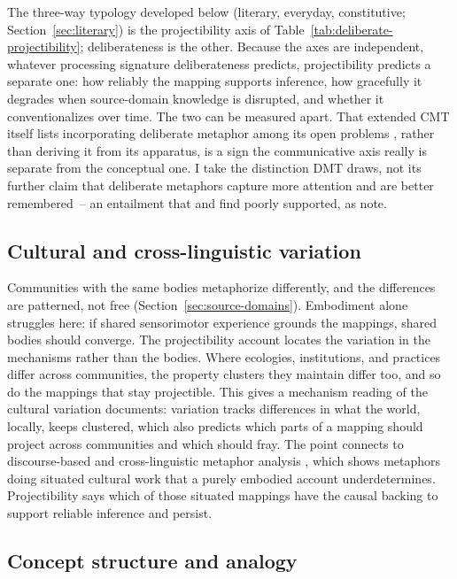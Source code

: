 The three-way typology developed below (literary, everyday, constitutive; Section~\ref{sec:literary}) is the projectibility axis of Table~\ref{tab:deliberate-projectibility}; deliberateness is the other. Because the axes are independent, whatever processing signature deliberateness predicts, projectibility predicts a separate one: how reliably the mapping supports inference, how gracefully it degrades when source-domain knowledge is disrupted, and whether it conventionalizes over time. The two can be measured apart. That extended CMT itself lists incorporating deliberate metaphor among its open problems \citep[113]{kovecses2020article}, rather than deriving it from its apparatus, is a sign the communicative axis really is separate from the conceptual one. I take the distinction DMT draws, not its further claim that deliberate metaphors capture more attention and are better remembered~-- an entailment that \textcite{gibbs2015dmt} and \textcite{thibodeau2017} find poorly supported, as \textcite{flusberg2018} note.

\subsection{Cultural and cross-linguistic variation}

Communities with the same bodies metaphorize differently, and the differences are patterned, not free (Section~\ref{sec:source-domains}). Embodiment alone struggles here: if shared sensorimotor experience grounds the mappings, shared bodies should converge. The projectibility account locates the variation in the mechanisms rather than the bodies. Where ecologies, institutions, and practices differ across communities, the property clusters they maintain differ too, and so do the mappings that stay projectible. This gives a mechanism reading of the cultural variation \textcite{kovecses2005} documents: variation tracks differences in what the world, locally, keeps clustered, which also predicts which parts of a mapping should project across communities and which should fray. The point connects to discourse-based and cross-linguistic metaphor analysis \citep[e.g.][]{semino2008, musolff2006}, which shows metaphors doing situated cultural work that a purely embodied account underdetermines. Projectibility says which of those situated mappings have the causal backing to support reliable inference and persist.

\subsection{Concept structure and analogy}

